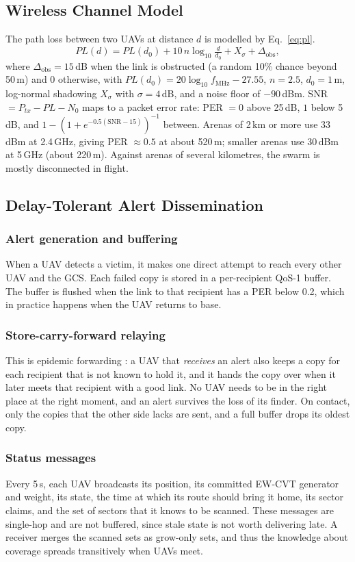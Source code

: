 \documentclass[10pt,a4paper,twocolumn]{article}
\begin{document}
\subsection{Wireless Channel Model}
The path loss between two UAVs at distance $d$ is modelled by Eq.~\ref{eq:pl}.
\begin{equation}
PL(d)=PL(d_0)+10\,n\log_{10}\tfrac{d}{d_0}+X_\sigma+\Delta_{\text{obs}},
\label{eq:pl}
\end{equation}
where $\Delta_{\text{obs}}=15$\,dB when the link is obstructed (a random 10\% chance beyond 50\,m) and 0 otherwise,
with $PL(d_0)=20\log_{10}f_{\text{MHz}}-27.55$, $n=2.5$, $d_0=1$\,m, log-normal shadowing $X_\sigma$ with $\sigma=4$\,dB, and a noise floor of $-90$\,dBm. SNR $=P_{tx}-PL-N_0$ maps to a packet error rate: PER $=0$ above 25\,dB, $1$ below 5\,dB, and $1-(1+e^{-0.5(\text{SNR}-15)})^{-1}$ between. Arenas of 2\,km or more use 33\,dBm at 2.4\,GHz, giving PER $\approx0.5$ at about 520\,m; smaller arenas use 30\,dBm at 5\,GHz (about 220\,m). Against arenas of several kilometres, the swarm is mostly disconnected in flight.

\subsection{Delay-Tolerant Alert Dissemination}
\subsubsection{Alert generation and buffering}When a UAV detects a victim, it makes one direct attempt to reach every other UAV and the GCS. Each failed copy is stored in a per-recipient QoS-1 buffer. The buffer is flushed when the link to that recipient has a PER below 0.2, which in practice happens when the UAV returns to base.

\subsubsection{Store-carry-forward relaying}This is epidemic forwarding \cite{vahdat2000epidemic}: a UAV that \emph{receives} an alert also keeps a copy for each recipient that is not known to hold it, and it hands the copy over when it later meets that recipient with a good link. No UAV needs to be in the right place at the right moment, and an alert survives the loss of its finder. On contact, only the copies that the other side lacks are sent, and a full buffer drops its oldest copy.

\subsubsection{Status messages}Every 5\,s, each UAV broadcasts its position, its committed EW-CVT generator and weight, its state, the time at which its route should bring it home, its sector claims, and the set of sectors that it knows to be scanned. These messages are single-hop and are not buffered, since stale state is not worth delivering late. A receiver merges the scanned sets as grow-only sets, and thus the knowledge about coverage spreads transitively when UAVs meet.
\end{document}
